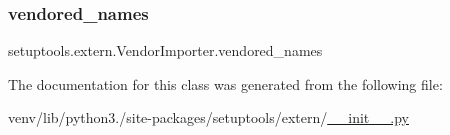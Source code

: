 \subsubsection{\texorpdfstring{vendored\+\_\+names}{vendored\_names}}
{\footnotesize\ttfamily setuptools.\+extern.\+Vendor\+Importer.\+vendored\+\_\+names}



The documentation for this class was generated from the following file\+:\begin{DoxyCompactItemize}
\item 
venv/lib/python3./site-\/packages/setuptools/extern/\hyperlink{venv_2lib_2python3_89_2site-packages_2setuptools_2extern_2____init_____8py}{\+\_\+\+\_\+init\+\_\+\+\_\+.\+py}\end{DoxyCompactItemize}
